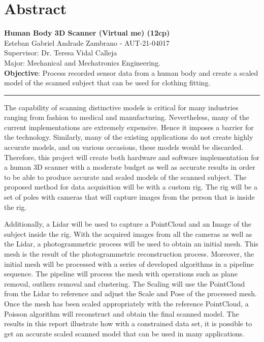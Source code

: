 \documentclass[12pt]{report}
\begin{document}
\chapter*{Abstract}
\textbf{Human Body 3D Scanner (Virtual me) (12cp)}\\
Esteban Gabriel Andrade Zambrano - AUT-21-04017\\
Supervisor: Dr. Teresa Vidal Calleja\\
Major: Mechanical and Mechatronics Engineering.\\
\textbf{Objective}: Process recorded sensor data from a human body and create a scaled model of the scanned subject that can be used for clothing fitting.\\
\rule{\textwidth}{0.1pt}
The capability of scanning distinctive models is critical for many industries ranging from fashion to medical and manufacturing. 
Nevertheless, many of the current implementations are extremely expensive. Hence it imposes a barrier for the technology.
 Similarly, many of the existing applications do not create highly accurate models, and on various occasions, these models would be discarded. 
 Therefore, this project will create both hardware and software implementation for a human 3D scanner with a moderate budget as well as accurate results in order to be able to produce accurate and scaled models of the scanned subject. 
 The proposed method for data acquisition will be with a custom rig. The rig will be a set of poles with cameras that will capture images from the person that is inside the rig.

Additionally, a Lidar will be used to capture a PointCloud and an Image of the subject inside the rig. 
With the acquired images from all the cameras as well as the Lidar, a photogrammetric process will be used to obtain an initial mesh. 
This mesh is the result of the photogrammetric reconstruction process. Moreover, the initial mesh will be processed with a series of developed algorithms in a pipeline sequence. 
The pipeline will process the mesh with operations such as plane removal, outliers removal and clustering. 
The Scaling will use the PointCloud from the Lidar to reference and adjust the Scale and Pose of the processed mesh. 
Once the mesh has been scaled appropriately with the reference PointCloud, a Poisson algorithm will reconstruct and obtain the final scanned model. 
The results in this report illustrate how with a constrained data set, it is possible to get an accurate scaled scanned model that can be used in many applications.
\end{document}
